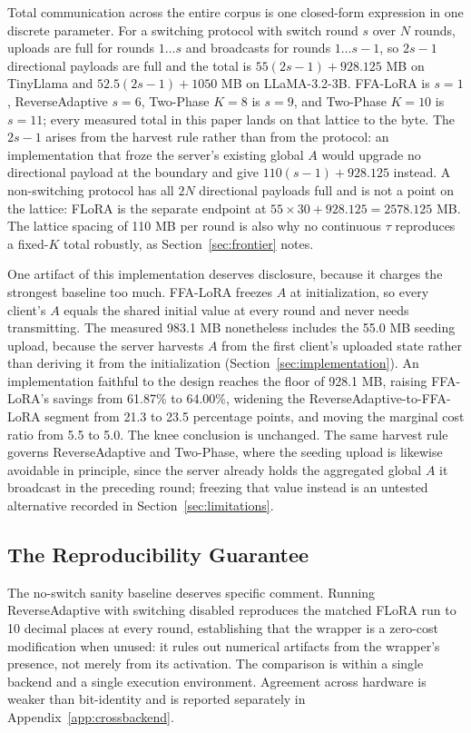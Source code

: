 Total communication across the entire corpus is one closed-form expression in one discrete parameter. For a switching protocol with switch round $s$ over $N$ rounds, uploads are full for rounds $1 \ldots s$ and broadcasts for rounds $1 \ldots s{-}1$, so $2s-1$ directional payloads are full and the total is $55(2s-1) + 928.125$ MB on TinyLlama and $52.5(2s-1) + 1050$ MB on LLaMA-3.2-3B. FFA-LoRA is $s{=}1$, ReverseAdaptive $s{=}6$, Two-Phase $K{=}8$ is $s{=}9$, and Two-Phase $K{=}10$ is $s{=}11$; every measured total in this paper lands on that lattice to the byte. The $2s-1$ arises from the harvest rule rather than from the protocol: an implementation that froze the server's existing global $A$ would upgrade no directional payload at the boundary and give $110(s-1) + 928.125$ instead. A non-switching protocol has all $2N$ directional payloads full and is not a point on the lattice: FLoRA is the separate endpoint at $55 \times 30 + 928.125 = 2578.125$ MB. The lattice spacing of 110 MB per round is also why no continuous $\tau$ reproduces a fixed-$K$ total robustly, as Section~\ref{sec:frontier} notes.

One artifact of this implementation deserves disclosure, because it charges the strongest baseline too much. FFA-LoRA freezes $A$ at initialization, so every client's $A$ equals the shared initial value at every round and never needs transmitting. The measured 983.1 MB nonetheless includes the 55.0 MB seeding upload, because the server harvests $A$ from the first client's uploaded state rather than deriving it from the initialization (Section~\ref{sec:implementation}). An implementation faithful to the design reaches the floor of 928.1 MB, raising FFA-LoRA's savings from 61.87\% to 64.00\%, widening the ReverseAdaptive-to-FFA-LoRA segment from 21.3 to 23.5 percentage points, and moving the marginal cost ratio from 5.5 to 5.0. The knee conclusion is unchanged. The same harvest rule governs ReverseAdaptive and Two-Phase, where the seeding upload is likewise avoidable in principle, since the server already holds the aggregated global $A$ it broadcast in the preceding round; freezing that value instead is an untested alternative recorded in Section~\ref{sec:limitations}.

\subsection{The Reproducibility Guarantee}
The no-switch sanity baseline deserves specific comment. Running ReverseAdaptive with switching disabled reproduces the matched FLoRA \citep{wang2024flora} run to 10 decimal places at every round, establishing that the wrapper is a zero-cost modification when unused: it rules out numerical artifacts from the wrapper's presence, not merely from its activation. The comparison is within a single backend and a single execution environment. Agreement across hardware is weaker than bit-identity and is reported separately in Appendix~\ref{app:crossbackend}.

